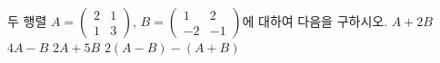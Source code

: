 두 행렬 $A=\begin{pmatrix} 2 & 1 \\ 1 & 3 \end{pmatrix}$, $B=\begin{pmatrix} 1 & 2 \\ -2 & -1 \end{pmatrix}$에 대하여 다음을 구하시오.
 $A+2B$
 $4A-B$
 $2A+5B$
 $2(A-B)-(A+B)$
